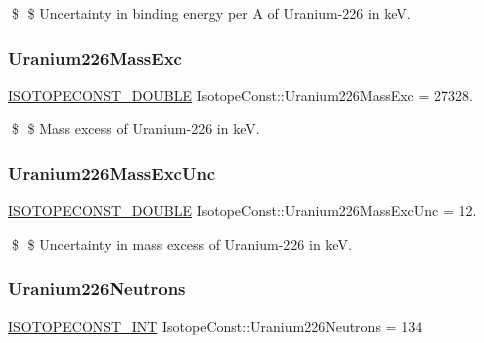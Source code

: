\$ \$ Uncertainty in binding energy per A of Uranium-\/226 in keV. \mbox{\label{group___isotope_const-_uranium-_u226_ga8801c14e9cc1ef77d31f0da3c036e26b}} 
\subsubsection{\texorpdfstring{Uranium226\+Mass\+Exc}{Uranium226MassExc}}
{\footnotesize\ttfamily \mbox{\hyperlink{group___isotope_const-_macros_ga8f45a7272ce02c0b4c65c44636ed719a}{I\+S\+O\+T\+O\+P\+E\+C\+O\+N\+S\+T\+\_\+\+D\+O\+U\+B\+LE}} Isotope\+Const\+::\+Uranium226\+Mass\+Exc = 27328.}

\$ \$ Mass excess of Uranium-\/226 in keV. \mbox{\label{group___isotope_const-_uranium-_u226_ga6e36f745307885a515f194cb118c86d3}} 
\subsubsection{\texorpdfstring{Uranium226\+Mass\+Exc\+Unc}{Uranium226MassExcUnc}}
{\footnotesize\ttfamily \mbox{\hyperlink{group___isotope_const-_macros_ga8f45a7272ce02c0b4c65c44636ed719a}{I\+S\+O\+T\+O\+P\+E\+C\+O\+N\+S\+T\+\_\+\+D\+O\+U\+B\+LE}} Isotope\+Const\+::\+Uranium226\+Mass\+Exc\+Unc = 12.}

\$ \$ Uncertainty in mass excess of Uranium-\/226 in keV. \mbox{\label{group___isotope_const-_uranium-_u226_ga69d99d8d434d798c1f8f8cae0f4f33a1}} 
\subsubsection{\texorpdfstring{Uranium226\+Neutrons}{Uranium226Neutrons}}
{\footnotesize\ttfamily \mbox{\hyperlink{group___isotope_const-_macros_ga5f18360b3e99483a35c32d789e62621c}{I\+S\+O\+T\+O\+P\+E\+C\+O\+N\+S\+T\+\_\+\+I\+NT}} Isotope\+Const\+::\+Uranium226\+Neutrons = 134}

